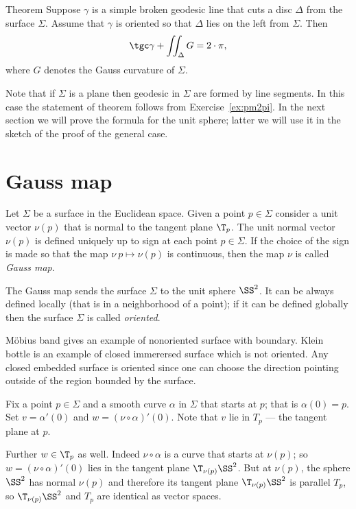 \begin{thm}{Theorem}
Suppose $\gamma$ is a simple broken geodesic line that cuts a disc $\Delta$ from the surface $\Sigma$.
Assume that $\gamma$ is oriented so that $\Delta$ lies on the left from $\Sigma$.
Then 
\[\tgc\gamma+\iint_\Delta G=2\cdot \pi,\]
where $G$ denotes the Gauss curvature of $\Sigma$.
\end{thm}

Note that if $\Sigma$ is a plane then geodesic in $\Sigma$ are formed by line segments.
In this case the statement of theorem follows from Exercise~\ref{ex:pm2pi}.
In the next section we will prove the formula for the unit sphere;
latter we will use it in the sketch of the proof of the general case.









\section{Gauss map}

Let $\Sigma$ be a surface in the Euclidean space.
Given a point $p\in\Sigma$ consider a unit vector $\nu(p)$ that is normal to the tangent plane $\T_p$. 
The unit normal vector $\nu(p)$ is defined uniquely up to sign at each point $p\in \Sigma$.
If the choice of the sign is made so that the map $\nu\:p\mapsto \nu(p)$ is continuous,
then the map $\nu$ is called \emph{Gauss map}.

The Gauss map sends the surface $\Sigma$ to the unit sphere $\SS^2$.
It can be always defined locally (that is in a neighborhood of a point);
if it can be defined globally then the surface $\Sigma$ is called \emph{oriented}.

M\"obius band gives an example of nonoriented surface with boundary.
Klein bottle is an example of closed immerersed surface which is not oriented.
Any closed embedded surface is oriented since one can choose the  direction pointing outside of the region bounded by the surface.

Fix a point $p\in \Sigma$ and a smooth curve $\alpha$ in $\Sigma$ that starts at $p$;
that is $\alpha(0)=p$.
Set  $v=\alpha'(0)$ and $w=(\nu\circ\alpha)'(0)$.
Note that $v$ lie in $T_p$ --- the tangent plane at $p$.

Further $w\in \T_p$ as well.
Indeed $\nu\circ\alpha$ is a curve that starts at $\nu(p)$;
so $w=(\nu\circ\alpha)'(0)$ lies in the tangent plane $\T_{\nu(p)}\SS^2$.
But at $\nu(p)$, the sphere $\SS^2$ has normal $\nu(p)$ and therefore its tangent plane $\T_{\nu(p)}\SS^2$ is parallel $T_p$, so $\T_{\nu(p)}\SS^2$ and $T_p$ are identical as vector spaces.

